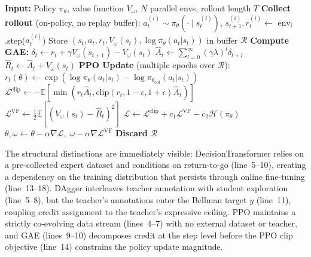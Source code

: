 \documentclass[11pt,a4paper]{article}
\theoremstyle{definition}
\begin{document}
\begin{algorithm}[ht]
\caption{PPO+GAE: on-policy self-play}
\label{alg:ppo}
\begin{algorithmic}[1]
\State \textbf{Input:} Policy $\pi_\theta$, value function $V_\omega$, $N$ parallel envs, rollout length $T$
    \State \textbf{Collect rollout} (on-policy, no replay buffer):
        \State $a_t^{(i)} \sim \pi_\theta(\cdot \mid s_t^{(i)})$, $s_{t+1}^{(i)}, r_t^{(i)} \gets$ env$_i$.step($a_t^{(i)}$)
        \State Store $(s_t, a_t, r_t, V_\omega(s_t), \log\pi_\theta(a_t|s_t))$ in buffer $\mathcal{R}$
    \EndFor
    \State \textbf{Compute GAE:}
    \State $\delta_t \gets r_t + \gamma V_\omega(s_{t+1}) - V_\omega(s_t)$
    \State $\hat{A}_t \gets \sum_{l=0}^\infty (\gamma\lambda)^l \delta_{t+l}$ 
    \State $\hat{R}_t \gets \hat{A}_t + V_\omega(s_t)$
    \State \textbf{PPO Update} (multiple epochs over $\mathcal{R}$):
        \State $r_t(\theta) \gets \exp(\log\pi_\theta(a_t|s_t) - \log\pi_{\theta_{\text{old}}}(a_t|s_t))$
        \State $\mathcal{L}^{\text{clip}} \gets -\mathbb{E}[\min(r_t \hat{A}_t, \text{clip}(r_t, 1-\epsilon, 1+\epsilon) \hat{A}_t)]$
        \State $\mathcal{L}^{\text{VF}} \gets \frac{1}{2}\mathbb{E}[(V_\omega(s_t) - \hat{R}_t)^2]$
        \State $\mathcal{L} \gets \mathcal{L}^{\text{clip}} + c_1 \mathcal{L}^{\text{VF}} - c_2 \mathcal{H}(\pi_\theta)$
        \State $\theta, \omega \gets \theta - \alpha \nabla\mathcal{L}, \; \omega - \alpha \nabla\mathcal{L}^{\text{VF}}$
    \EndFor
    \State \textbf{Discard} $\mathcal{R}$ 
\EndFor
\end{algorithmic}
\end{algorithm}

The structural distinctions are immediately visible: DecisionTransformer relies on a pre-collected expert dataset and conditions on return-to-go (line~5--10), creating a dependency on the training distribution that persists through online fine-tuning (line~13--18).
DAgger interleaves teacher annotation with student exploration (line~5--8), but the teacher's annotations enter the Bellman target $y$ (line~11), coupling credit assignment to the teacher's expressive ceiling.
PPO maintains a strictly co-evolving data stream (lines~4--7) with no external dataset or teacher, and GAE (lines~9--10) decomposes credit at the step level before the PPO clip objective (line~14) constrains the policy update magnitude.
\end{document}
